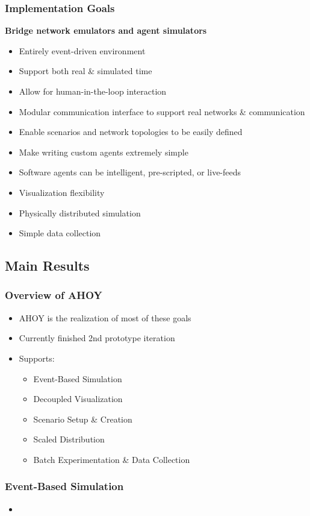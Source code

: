 \documentclass[mathserif]{beamer}
\begin{document}
\frame
{
    \frametitle{Implementation Goals}
    \textbf{Bridge network emulators and agent simulators}
    \begin{itemize}
        \item Entirely event-driven environment
        \item Support both real \& simulated time
        \item Allow for human-in-the-loop interaction
        \item Modular communication interface to support real networks \& communication
        \item Enable scenarios and network topologies to be easily defined
        \item Make writing custom agents extremely simple
        \item Software agents can be intelligent, pre-scripted, or live-feeds
        \item Visualization flexibility
        \item Physically distributed simulation
        \item Simple data collection
    \end{itemize}
}


\subsection{Main Results}

\frame
{
    \frametitle{Overview of AHOY}
    \begin{itemize}
        \item AHOY is the realization of most of these goals
        \item Currently finished 2nd prototype iteration
        \item Supports:
        \begin{itemize}
            \item Event-Based Simulation
            \item Decoupled Visualization
            \item Scenario Setup \& Creation
            \item Scaled Distribution
            \item Batch Experimentation \& Data Collection
        \end{itemize}
    \end{itemize}
}

\frame
{
    \frametitle{Event-Based Simulation}
    \textbf{}
    \begin{itemize}
        \item
    \end{itemize}
}
\end{document}
